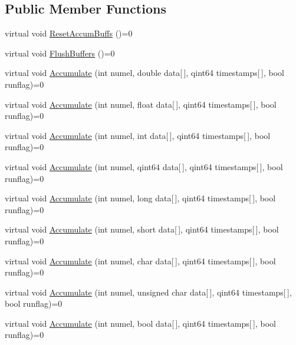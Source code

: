 \subsection*{\-Public \-Member \-Functions}
\begin{DoxyCompactItemize}
\item 
virtual void \hyperlink{classGRIDAQAccumNode_a738d4c7049abdf903c11f0f315202ce5}{\-Reset\-Accum\-Buffs} ()=0
\item 
virtual void \hyperlink{classGRIDAQAccumNode_a3835425d2d5ef5a63fc70e90ecc6faff}{\-Flush\-Buffers} ()=0
\item 
virtual void \hyperlink{classGRIDAQAccumNode_a975d0dd539b6977ef1f0f791e2362897}{\-Accumulate} (int numel, double data\mbox{[}$\,$\mbox{]}, qint64 timestamps\mbox{[}$\,$\mbox{]}, bool runflag)=0
\item 
virtual void \hyperlink{classGRIDAQAccumNode_aa9418de871167e1eabf92d24609bbe22}{\-Accumulate} (int numel, float data\mbox{[}$\,$\mbox{]}, qint64 timestamps\mbox{[}$\,$\mbox{]}, bool runflag)=0
\item 
virtual void \hyperlink{classGRIDAQAccumNode_ae8cee3f7e0f63a7b21ef3690ccad7284}{\-Accumulate} (int numel, int data\mbox{[}$\,$\mbox{]}, qint64 timestamps\mbox{[}$\,$\mbox{]}, bool runflag)=0
\item 
virtual void \hyperlink{classGRIDAQAccumNode_ad6080a31b2593b10b6df1ce1364686ef}{\-Accumulate} (int numel, qint64 data\mbox{[}$\,$\mbox{]}, qint64 timestamps\mbox{[}$\,$\mbox{]}, bool runflag)=0
\item 
virtual void \hyperlink{classGRIDAQAccumNode_a098599aab2aebbb267f5ce65da848195}{\-Accumulate} (int numel, long data\mbox{[}$\,$\mbox{]}, qint64 timestamps\mbox{[}$\,$\mbox{]}, bool runflag)=0
\item 
virtual void \hyperlink{classGRIDAQAccumNode_a0b725deb6ed608af61a62291d05c7672}{\-Accumulate} (int numel, short data\mbox{[}$\,$\mbox{]}, qint64 timestamps\mbox{[}$\,$\mbox{]}, bool runflag)=0
\item 
virtual void \hyperlink{classGRIDAQAccumNode_afb749d4044b61be6f2b36c106f75ec3d}{\-Accumulate} (int numel, char data\mbox{[}$\,$\mbox{]}, qint64 timestamps\mbox{[}$\,$\mbox{]}, bool runflag)=0
\item 
virtual void \hyperlink{classGRIDAQAccumNode_a59503ea7d79048623a39f17fa5be02fa}{\-Accumulate} (int numel, unsigned char data\mbox{[}$\,$\mbox{]}, qint64 timestamps\mbox{[}$\,$\mbox{]}, bool runflag)=0
\item 
virtual void \hyperlink{classGRIDAQAccumNode_aecddd350c17a924e3fc7cb3b5edb7327}{\-Accumulate} (int numel, bool data\mbox{[}$\,$\mbox{]}, qint64 timestamps\mbox{[}$\,$\mbox{]}, bool runflag)=0

\end{DoxyCompactItemize}
